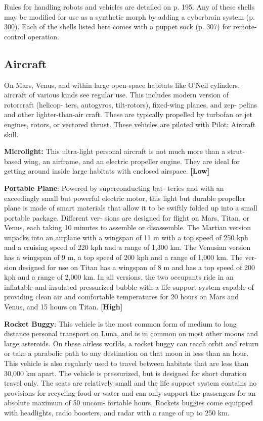 Rules for handling robots and vehicles are detailed 
on p. 195. Any of these shells may be modified for use 
as a synthetic morph by adding a cyberbrain system 
(p. 300). Each of the shells listed here comes with a 
puppet sock (p. 307) for remote-control operation.

\subsection{Aircraft}

On Mars, Venus, and within large open-space habitats 
like O'Neil cylinders, aircraft of various kinds see regular 
use. This includes modern version of rotorcraft (helicop-
ters, autogyros, tilt-rotors), fixed-wing planes, and zep-
pelins and other lighter-than-air craft. These are typically 
propelled by turbofan or jet engines, rotors, or vectored 
thrust. These vehicles are piloted with Pilot: Aircraft skill.

\textbf{Microlight:} This ultra-light personal aircraft is 
not much more than a strut-based wing, an airframe, 
and an electric propeller engine. They are ideal for 
getting around inside large habitats with enclosed 
airspace. \textbf{[Low]}

\textbf{Portable Plane}: Powered by superconducting bat-
teries and with an exceedingly small but powerful 
electric motor, this light but durable propeller plane 
is made of smart materials that allow it to be swiftly 
folded up into a small portable package. Different ver-
sions are designed for flight on Mars, Titan, or Venus, 
each taking 10 minutes to assemble or disassemble. 
The Martian version unpacks into an airplane with a 
wingspan of 11 m with a top speed of 250 kph and a 
cruising speed of 220 kph and a range of 1,300 km. 
The Venusian version has a wingspan of 9 m, a top 
speed of 200 kph and a range of 1,000 km. The ver-
sion designed for use on Titan has a wingspan of 8 
m and has a top speed of 200 kph and a range of 
2,000 km. In all versions, the two occupants ride in 
an inflatable and insulated pressurized bubble with a 
life support system capable of providing clean air and 
comfortable temperatures for 20 hours on Mars and 
Venus, and 15 hours on Titan. \textbf{[High]}

\textbf{Rocket Buggy}: This vehicle is the most common 
form of medium to long distance personal transport 
on Luna, and is in common on most other moons 
and large asteroids. On these airless worlds, a rocket 
buggy can reach orbit and return or take a parabolic 
path to any destination on that moon in less than 
an hour. This vehicle is also regularly used to travel 
between habitats that are less than 30,000 km apart. 
The vehicle is pressurized, but is designed for short 
duration travel only. The seats are relatively small 
and the life support system contains no provisions 
for recycling food or water and can only support the 
passengers for an absolute maximum of 50 uncom-
fortable hours. Rockets buggies come equipped with 
headlights, radio boosters, and radar with a range of 
up to 250 km.

